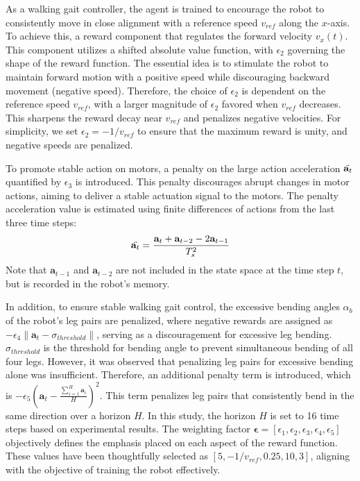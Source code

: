 As a walking gait controller, the agent is trained to encourage the robot to consistently move in close alignment with a reference speed $v_{ref}$ along the $x$-axis. To achieve this, a reward component that regulates the forward velocity $v_x(t)$. This component utilizes a shifted absolute value function, with $\epsilon_2$ governing the shape of the reward function. The essential idea  is to stimulate the robot to maintain forward motion with a positive speed while discouraging backward movement (negative speed). Therefore, the choice of $\epsilon_2$ is dependent on the reference speed $v_{ref}$, with a larger magnitude of $\epsilon_2$ favored when $v_{ref}$ decreases. This sharpens the reward decay near $v_{ref}$ and penalizes negative velocities. For simplicity, we set $\epsilon_2 = −1/v_{ref}$ to ensure that the maximum reward is unity, and negative speeds are penalized. 

To promote stable action on motors, a penalty on the large action acceleration $\Ddot{\mathbf{a}_t}$ quantified by $\epsilon_3$ is introduced. This penalty discourages abrupt changes in motor actions, aiming to deliver a stable actuation signal to the motors. The penalty acceleration value is estimated using finite differences of actions from the last three time steps: $$\Ddot{\mathbf{a}_t} = \frac{\mathbf{a}_t+\mathbf{a}_{t-2}-2\mathbf{a}_{t-1}}{T_s^2}$$ Note that $\mathbf{a}_{t-1}$ and $\mathbf{a}_{t-2}$ are not included in the state space at the time step $t$, but is recorded in the robot's memory.

In addition, to ensure stable walking gait control, the excessive bending angles $\alpha_b$ of the robot's leg pairs are penalized, where negative rewards are assigned as $- \epsilon_4\lVert\mathbf{a}_t-\sigma_{threshold}\rVert$, serving as a discouragement for excessive leg bending. $\sigma_{threshold}$ is the threshold for bending angle to prevent simultaneous bending of all four legs. However, it was observed that penalizing leg pairs for excessive bending alone was insufficient. Therefore, an additional penalty term is introduced, which is $ - \epsilon_5(\mathbf{a}_t-\frac{\sum_{i=1}^{H}\mathbf{a}_i}{H})^2$. This term penalizes leg pairs that consistently bend in the same direction over a horizon $H$. In this study, the horizon $H$ is set to 16 time steps based on experimental results. The weighting factor $\pmb{\epsilon} = [\epsilon_1, \epsilon_2, \epsilon_3, \epsilon_4, \epsilon_5]$ objectively defines the emphasis placed on each aspect of the reward function. These values have been thoughtfully selected as $[5, −1/v_{ref}, 0.25, 10, 3]$, aligning with the objective of training the robot effectively.


